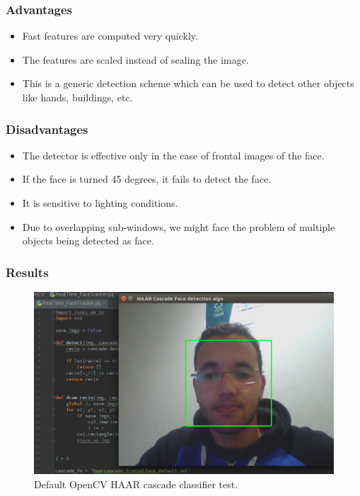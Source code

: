 \documentclass[a4paper,12pt]{report}
\begin{document}
\subsubsection{Advantages}

      \begin{itemize}
      \item Fast features are computed very quickly. 
      \item The features are scaled instead of scaling the image. 
      \item This is a generic detection scheme which can be used to detect other objects like hands, buildings, etc. 
      \end{itemize}

\subsubsection{Disadvantages}

      \begin{itemize}
	\item The detector is effective only in the case of frontal images of the face. 
	\item If the face is turned 45 degrees, it fails to detect the face. 
	\item It is sensitive to lighting conditions.
	\item Due  to  overlapping  sub-windows,  we  might  face  the  problem  of  multiple  objects  being  detected  as face. 
      \end{itemize}

\subsubsection{Results}

      \begin{figure}[h]
	\centering
	\caption{\label{haar_result} Default OpenCV HAAR cascade classifier test.}
	\includegraphics[scale=0.5]{haar_test.png}
      \end{figure}
\end{document}
